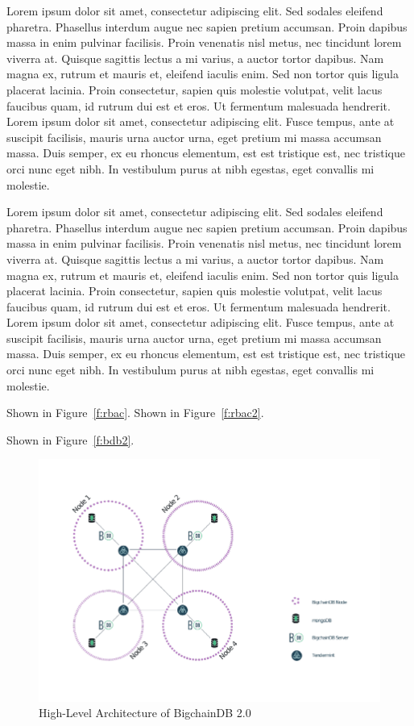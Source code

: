 Lorem ipsum dolor sit amet, consectetur adipiscing elit. Sed sodales
eleifend pharetra. Phasellus interdum augue nec sapien pretium accumsan.
Proin dapibus massa in enim pulvinar facilisis. Proin venenatis nisl metus,
nec tincidunt lorem viverra at. Quisque sagittis lectus a mi varius, a
auctor tortor dapibus. Nam magna ex, rutrum et mauris et, eleifend iaculis
enim. Sed non tortor quis ligula placerat lacinia. Proin consectetur, sapien
quis molestie volutpat, velit lacus faucibus quam, id rutrum dui est et
eros. Ut fermentum malesuada hendrerit. Lorem ipsum dolor sit amet,
consectetur adipiscing elit. Fusce tempus, ante at suscipit facilisis,
mauris urna auctor urna, eget pretium mi massa accumsan massa. Duis semper,
ex eu rhoncus elementum, est est tristique est, nec tristique orci nunc eget
nibh. In vestibulum purus at nibh egestas, eget convallis mi molestie.

Lorem ipsum dolor sit amet, consectetur adipiscing elit. Sed sodales
eleifend pharetra. Phasellus interdum augue nec sapien pretium accumsan.
Proin dapibus massa in enim pulvinar facilisis. Proin venenatis nisl metus,
nec tincidunt lorem viverra at. Quisque sagittis lectus a mi varius, a
auctor tortor dapibus. Nam magna ex, rutrum et mauris et, eleifend iaculis
enim. Sed non tortor quis ligula placerat lacinia. Proin consectetur, sapien
quis molestie volutpat, velit lacus faucibus quam, id rutrum dui est et
eros. Ut fermentum malesuada hendrerit. Lorem ipsum dolor sit amet,
consectetur adipiscing elit. Fusce tempus, ante at suscipit facilisis,
mauris urna auctor urna, eget pretium mi massa accumsan massa. Duis semper,
ex eu rhoncus elementum, est est tristique est, nec tristique orci nunc eget
nibh. In vestibulum purus at nibh egestas, eget convallis mi molestie.







Shown in Figure~\ref{f:rbac}.
Shown in Figure~\ref{f:rbac2}.

Shown in Figure~\ref{f:bdb2}.

\begin{figure}[!htb]
	\centering\includegraphics[width=\columnwidth]{images/bdb-arch.pdf}  
	\caption{High-Level Architecture of BigchainDB 
		2.0~\cite{bdb18d}}\label{f:bdb}
\end{figure}

